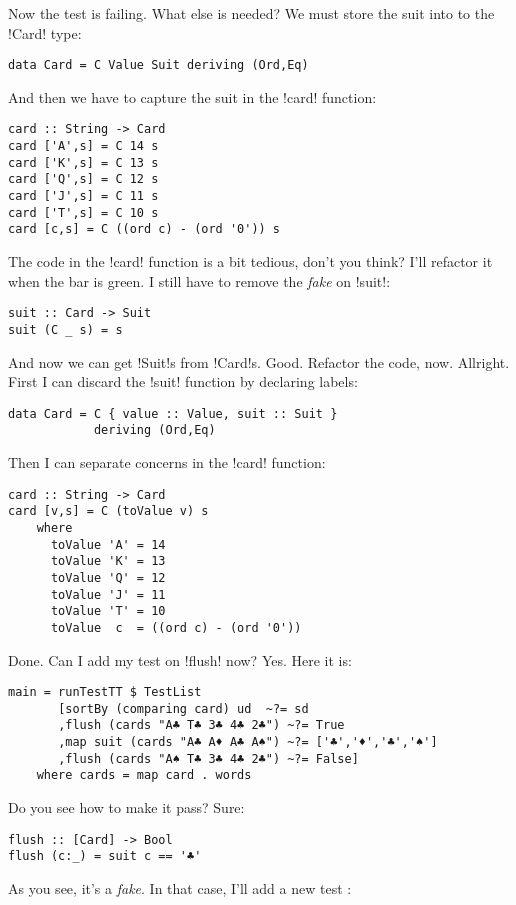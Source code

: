 \failure Now the test is failing.
\lhN What else is needed?
\lhA \failure We must store the suit into to the \il!Card! type:
\begin{lstlisting}[frame=single]
data Card = C Value Suit deriving (Ord,Eq)
\end{lstlisting}
And then we have to capture the suit in the \il!card! function:
\begin{lstlisting}[frame=single]
card :: String -> Card
card ['A',s] = C 14 s
card ['K',s] = C 13 s
card ['Q',s] = C 12 s
card ['J',s] = C 11 s
card ['T',s] = C 10 s
card [c,s] = C ((ord c) - (ord '0')) s
\end{lstlisting}
\lhN \failure The code in the \il!card! function is a bit tedious, don't you think?
\lhA \failure I'll refactor it when the bar is green. I still have to remove the \emph{fake} on \il!suit!:
\begin{lstlisting}[frame=single]
suit :: Card -> Suit
suit (C _ s) = s
\end{lstlisting}
\success And now we can get \il!Suit!s from \il!Card!s.
\lhN Good. Refactor the code, now.
\lhA \success Allright. First I can discard the \il!suit! function by declaring labels:
\begin{lstlisting}[frame=single]
data Card = C { value :: Value, suit :: Suit } 
            deriving (Ord,Eq)
\end{lstlisting}
Then I can separate concerns in the \il!card! function:
\begin{lstlisting}[frame=single]
card :: String -> Card
card [v,s] = C (toValue v) s
    where 
      toValue 'A' = 14
      toValue 'K' = 13
      toValue 'Q' = 12
      toValue 'J' = 11
      toValue 'T' = 10
      toValue  c  = ((ord c) - (ord '0'))
\end{lstlisting}
\success Done.
\lhN Can I add my test on \il!flush! now?
\lhA Yes.
\lhN Here it is:
\begin{lstlisting}[frame=single]
main = runTestTT $ TestList 
       [sortBy (comparing card) ud  ~?= sd
       ,flush (cards "A♣ T♣ 3♣ 4♣ 2♣") ~?= True
       ,map suit (cards "A♣ A♦ A♣ A♠") ~?= ['♣','♦','♣','♠']
       ,flush (cards "A♠ T♣ 3♣ 4♣ 2♣") ~?= False]
    where cards = map card . words
\end{lstlisting} %
Do you see how to make it pass?
\lhA \failure Sure: 
\begin{lstlisting}[frame=single]
flush :: [Card] -> Bool
flush (c:_) = suit c == '♣'
\end{lstlisting}
\success As you see, it's a \emph{fake}.
\lhN In that case, I'll add a new test :
